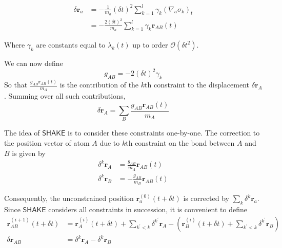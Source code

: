 \begin{tcolorbox}
	\begin{equation}
	\label{eq:shake-verlet-displacement}
	\begin{aligned}
	\delta \mathbf{r}_a &= - \frac{1}{m_a}(\delta t)^2 \sum_{k = 1}^l \gamma_k ( \nabla_a \sigma_k )_{t} 	\\
	&= - \frac{2(\delta t)^2}{m_a} \sum_{k = 1}^{l} \gamma_k \mathbf{r}_{AB}(t)
	\end{aligned}
	\end{equation} 
\end{tcolorbox}
Where $\gamma_k$ are constants equal to $\lambda_k(t)$ up to order $\mathcal{O}(\delta t^2)$.
\par We can now define
\begin{equation}
\label{eq:theory-gab}
g_{AB} = - 2 (\delta t)^2 \gamma_k
\end{equation}
So that $\frac{g_{AB} \mathbf{r}_{AB}(t)}{m_A}$ is the contribution of the $k$th constraint to the displacement $\delta \mathbf{r}_A$. Summing over all such contributions, 
\begin{equation}
\label{eq:shake-full-displacement}
\delta \mathbf{r}_A = \sum_{B} \frac{g_{AB} \mathbf{r}_{AB}(t)}{m_A}
\end{equation}
\par The idea of $\textsf{SHAKE}$ is to consider these constraints one-by-one. The correction to the position vector of atom $A$ due to $k$th constraint on the bond between $A$ and $B$ is given by
\begin{equation*}
\begin{aligned}
\delta^k \mathbf{r}_A &= \frac{g_{AB}}{m_A} \mathbf{r}_{AB}(t)		\\
\delta^k \mathbf{r}_B &= -\frac{g_{AB}}{m_B} \mathbf{r}_{AB}(t)
\end{aligned}
\end{equation*}
\par Consequently, the unconstrained position $\mathbf{r}^{(0)}_a(t + \delta t)$ is corrected by $\sum_{k} \delta^k \mathbf{r}_a$. Since $\textsf{SHAKE}$ considers all constraints in succession, it is convenient to define 
\begin{equation*}
\begin{aligned}
\mathbf{r}^{(i + 1)}_{AB}(t + \delta t) &= \mathbf{r}^{(i)}_{A}(t + \delta t) + \sum_{k^\prime < k} \delta^{k^\prime} \mathbf{r}_A - (\mathbf{r}^{(i)}_{B}(t + \delta t) + \sum_{k^\prime < k} \delta^{k^\prime} \mathbf{r}_B) \\
\delta \mathbf{r}_{AB} &= \delta^{k} \mathbf{r}_{A} - \delta^{k} \mathbf{r}_{B}
\end{aligned}
\end{equation*}
